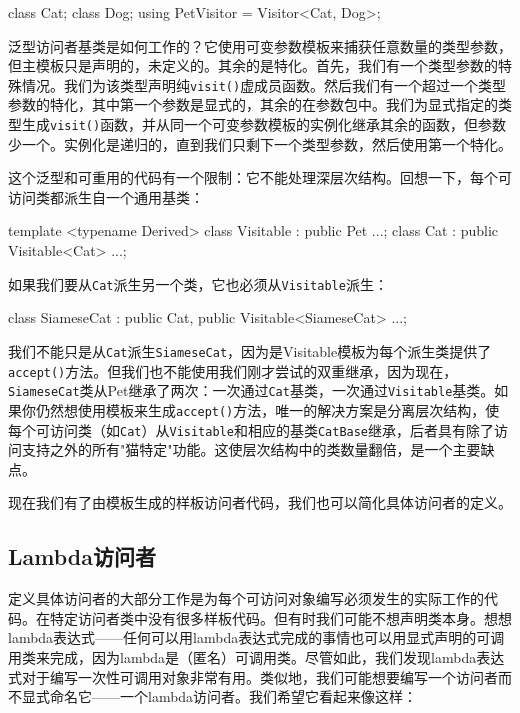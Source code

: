 \begin{code}
{\begin{code}
class Cat;
class Dog;
using PetVisitor = Visitor<Cat, Dog>;
\end{code}

泛型访问者基类是如何工作的？它使用可变参数模板来捕获任意数量的类型参数，但主模板只是声明的，未定义的。其余的是特化。首先，我们有一个类型参数的特殊情况。我们为该类型声明纯\texttt{visit()}虚成员函数。然后我们有一个超过一个类型参数的特化，其中第一个参数是显式的，其余的在参数包中。我们为显式指定的类型生成\texttt{visit()}函数，并从同一个可变参数模板的实例化继承其余的函数，但参数少一个。实例化是递归的，直到我们只剩下一个类型参数，然后使用第一个特化。

这个泛型和可重用的代码有一个限制：它不能处理深层次结构。回想一下，每个可访问类都派生自一个通用基类：

\begin{code}
template <typename Derived>
class Visitable : public Pet {...};
class Cat : public Visitable<Cat> {...};
\end{code}

如果我们要从\texttt{Cat}派生另一个类，它也必须从\texttt{Visitable}派生：

\begin{code}
class SiameseCat : public Cat,
                   public Visitable<SiameseCat> {...};
\end{code}

我们不能只是从\texttt{Cat}派生\texttt{SiameseCat}，因为是Visitable模板为每个派生类提供了\texttt{accept()}方法。但我们也不能使用我们刚才尝试的双重继承，因为现在，\texttt{SiameseCat}类从Pet继承了两次：一次通过\texttt{Cat}基类，一次通过\texttt{Visitable}基类。如果你仍然想使用模板来生成\texttt{accept()}方法，唯一的解决方案是分离层次结构，使每个可访问类（如\texttt{Cat}）从\texttt{Visitable}和相应的基类\texttt{CatBase}继承，后者具有除了访问支持之外的所有"猫特定"功能。这使层次结构中的类数量翻倍，是一个主要缺点。

现在我们有了由模板生成的样板访问者代码，我们也可以简化具体访问者的定义。

\subsection{Lambda访问者}

定义具体访问者的大部分工作是为每个可访问对象编写必须发生的实际工作的代码。在特定访问者类中没有很多样板代码。但有时我们可能不想声明类本身。想想lambda表达式——任何可以用lambda表达式完成的事情也可以用显式声明的可调用类来完成，因为lambda是（匿名）可调用类。尽管如此，我们发现lambda表达式对于编写一次性可调用对象非常有用。类似地，我们可能想要编写一个访问者而不显式命名它——一个lambda访问者。我们希望它看起来像这样：

}
\end{code}
